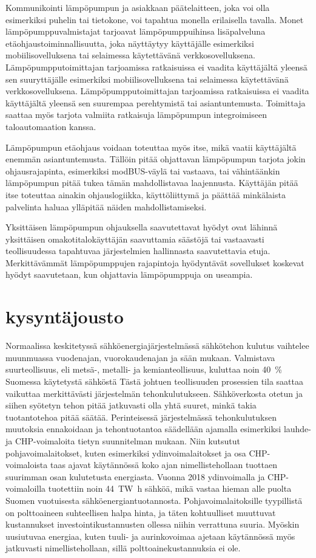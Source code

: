   Kommunikointi lämpöpumpun ja asiakkaan päätelaitteen, joka voi olla esimerkiksi puhelin tai tietokone, voi tapahtua monella erilaisella tavalla. Monet lämpöpumppuvalmistajat tarjoavat lämpöpumppuihinsa lisäpalveluna etäohjaustoiminnallisuutta, joka näyttäytyy käyttäjälle esimerkiksi mobiilisovelluksena tai selaimessa käytettävänä verkkosovelluksena. Lämpöpumpputoimittajan tarjoamissa ratkaisuissa ei vaadita käyttäjältä yleensä sen suuryttäjälle esimerkiksi mobiilisovelluksena tai selaimessa käytettävänä verkkosovelluksena. Lämpöpumpputoimittajan tarjoamissa ratkaisuissa ei vaadita käyttäjältä yleensä sen suurempaa perehtymistä tai asiantuntemusta. Toimittaja saattaa myös tarjota valmiita ratkaisuja lämpöpumpun integroimiseen taloautomaation kanssa.

  Lämpöpumpun etäohjaus voidaan toteuttaa myös itse, mikä vaatii käyttäjältä enemmän asiantuntemusta. Tällöin pitää ohjattavan lämpöpumpun tarjota jokin ohjausrajapinta, esimerkiksi modBUS-väylä tai vastaava, tai vähintäänkin lämpöpumpun pitää tukea tämän mahdollistavaa laajennusta. Käyttäjän pitää itse toteuttaa ainakin ohjauslogiikka, käyttöliittymä ja päättää minkälaista palvelinta haluaa ylläpitää näiden mahdollistamiseksi.

  Yksittäisen lämpöpumpun ohjauksella saavutettavat hyödyt ovat lähinnä yksittäisen omakotitalokäyttäjän saavuttamia säästöjä tai vastaavasti teollisuudessa tapahtuvaa järjestelmien hallinnasta saavutettavia etuja. Merkittävämmät lämpöpumppujen rajapintoja hyödyntävät sovellukset koskevat hyödyt saavutetaan, kun ohjattavia lämpöpumppuja on useampia.

\section{kysyntäjousto}

  Normaalissa keskitetyssä sähköenergiajärjestelmässä sähkötehon kulutus vaihtelee muunmuassa vuodenajan, vuorokaudenajan ja sään mukaan. Valmistava suurteollisuus, eli metsä-, metalli- ja kemianteollisuus, kuluttaa noin \SI{40}{\percent} Suomessa käytetystä sähköstä Tästä johtuen teollisuuden prosessien tila saattaa vaikuttaa merkittävästi järjestelmän tehonkulutukseen\parencite{SVTehk}. Sähköverkosta otetun ja siihen syötetyn tehon pitää jatkuvasti olla yhtä suuret, minkä takia tuotantotehoa pitää säätää. Perinteisessä järjestelmässä tehonkulutuksen muutoksia ennakoidaan ja tehontuotantoa säädellään ajamalla esimerkiksi lauhde- ja \gls{CHP}-voimaloita tietyn suunnitelman mukaan.\parencite{energiateollisuus} Niin kutsutut pohjavoimalaitokset, kuten esimerkiksi ydinvoimalaitokset ja osa \gls{CHP}-voimaloista taas ajavat käytännössä koko ajan nimellistehollaan tuottaen suurimman osan kulutetusta energiasta. Vuonna 2018 ydinvoimalla ja CHP-voimaloilla tuotettiin noin \SI{44}{\tera\watt\hour} sähköä, mikä vastaa hieman alle puolta Suomen vuotuisesta sähköenergiantuotannosta.\parencite{SVTSaLaTuo} Pohjavoimalaitoksille tyypillistä on polttoaineen suhteellisen halpa hinta, ja täten kohtuulliset muuttuvat kustannukset investointikustannusten ollessa niihin verrattuna suuria. Myöskin uusiutuvaa energiaa, kuten tuuli- ja aurinkovoimaa ajetaan käytännössä myös jatkuvasti nimellistehollaan, sillä polttoainekustannuksia ei ole.

